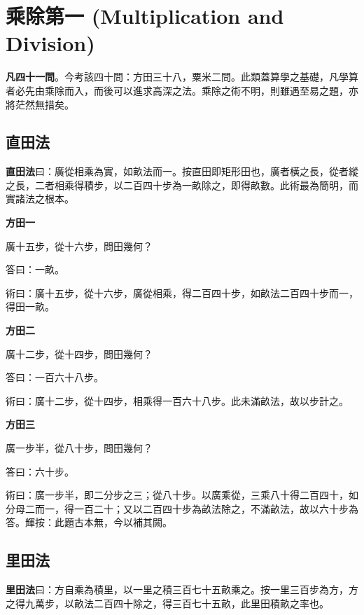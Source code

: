 \documentclass[11pt,a4paper]{article}
\newenvironment{problemenv}[1]{%
  \medskip\noindent\textbf{#1}\par\nopagebreak\smallskip
}{\medskip}
\begin{document}
\newpage

\section{乘除第一 (Multiplication and Division)}

\textbf{凡四十一問}。今考該四十問：方田三十八，粟米二問。此類蓋算學之基礎，凡學算者必先由乘除而入，而後可以進求高深之法。乘除之術不明，則雖遇至易之題，亦將茫然無措矣。

\subsection{直田法}

\textbf{直田法}曰：廣從相乘為實，如畝法而一。按直田即矩形田也，廣者橫之長，從者縱之長，二者相乘得積步，以二百四十步為一畝除之，即得畝數。此術最為簡明，而實諸法之根本。

\begin{problemenv}{方田一}
廣十五步，從十六步，問田幾何？

\textsf{答曰：}一畝。

\textsf{術曰：}廣十五步，從十六步，廣從相乘，得二百四十步，如畝法二百四十步而一，得田一畝。
\end{problemenv}

\begin{problemenv}{方田二}
廣十二步，從十四步，問田幾何？

\textsf{答曰：}一百六十八步。

\textsf{術曰：}廣十二步，從十四步，相乘得一百六十八步。此未滿畝法，故以步計之。
\end{problemenv}

\begin{problemenv}{方田三}
廣一步半，從八十步，問田幾何？

\textsf{答曰：}六十步。

\textsf{術曰：}廣一步半，即二分步之三；從八十步。以廣乘從，三乘八十得二百四十，如分母二而一，得一百二十；又以二百四十步為畝法除之，不滿畝法，故以六十步為答。輝按：此題古本無，今以補其闕。
\end{problemenv}

\subsection{里田法}

\textbf{里田法}曰：方自乘為積里，以一里之積三百七十五畝乘之。按一里三百步為方，方之得九萬步，以畝法二百四十除之，得三百七十五畝，此里田積畝之率也。
\end{document}
